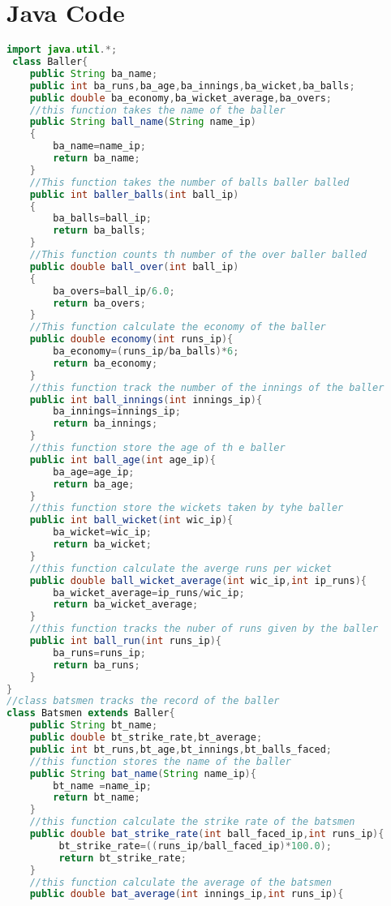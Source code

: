 \documentclass{article}
\begin{document}
\section{Java Code}
\begin{lstlisting}[style=chstyle,language=Java]
import java.util.*;
 class Baller{
    public String ba_name;
    public int ba_runs,ba_age,ba_innings,ba_wicket,ba_balls;
    public double ba_economy,ba_wicket_average,ba_overs;
    //this function takes the name of the baller
    public String ball_name(String name_ip)
    {
        ba_name=name_ip;
        return ba_name;
    }
    //This function takes the number of balls baller balled
    public int baller_balls(int ball_ip)
    {
        ba_balls=ball_ip;
        return ba_balls;
    }
    //This function counts th number of the over baller balled
    public double ball_over(int ball_ip)
    {
        ba_overs=ball_ip/6.0;
        return ba_overs;
    }
    //This function calculate the economy of the baller
    public double economy(int runs_ip){
        ba_economy=(runs_ip/ba_balls)*6;
        return ba_economy;
    }
    //this function track the number of the innings of the baller
    public int ball_innings(int innings_ip){
        ba_innings=innings_ip;
        return ba_innings;
    }
    //this function store the age of th e baller
    public int ball_age(int age_ip){
        ba_age=age_ip;
        return ba_age;
    }
    //this function store the wickets taken by tyhe baller
    public int ball_wicket(int wic_ip){
        ba_wicket=wic_ip;
        return ba_wicket;
    }
    //this function calculate the averge runs per wicket
    public double ball_wicket_average(int wic_ip,int ip_runs){
        ba_wicket_average=ip_runs/wic_ip;
        return ba_wicket_average;
    }
    //this function tracks the nuber of runs given by the baller
    public int ball_run(int runs_ip){
        ba_runs=runs_ip;
        return ba_runs;
    }
}
//class batsmen tracks the record of the baller
class Batsmen extends Baller{
    public String bt_name;
    public double bt_strike_rate,bt_average;
    public int bt_runs,bt_age,bt_innings,bt_balls_faced;
    //this function stores the name of the baller
    public String bat_name(String name_ip){
        bt_name =name_ip;
        return bt_name;
    }
    //this function calculate the strike rate of the batsmen
    public double bat_strike_rate(int ball_faced_ip,int runs_ip){
         bt_strike_rate=((runs_ip/ball_faced_ip)*100.0);
         return bt_strike_rate;
    }
    //this function calculate the average of the batsmen
    public double bat_average(int innings_ip,int runs_ip){

\end{lstlisting}
\end{document}
